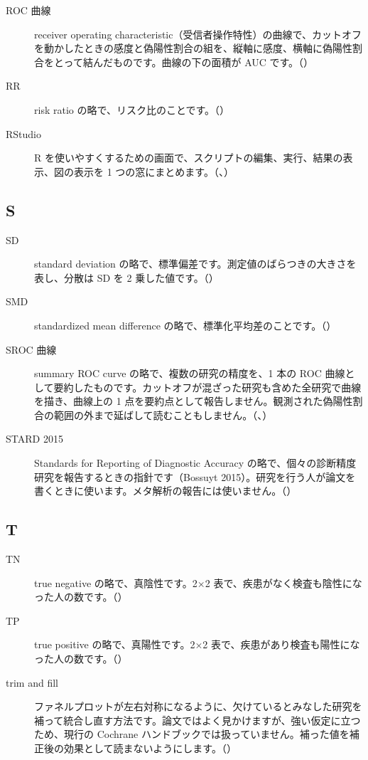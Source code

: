 \begin{description}
\item[ROC 曲線] receiver operating characteristic（受信者操作特性）の曲線で、カットオフを動かしたときの感度と偽陽性割合の組を、縦軸に感度、横軸に偽陽性割合をとって結んだものです。曲線の下の面積が AUC です。（）
\item[RR] risk ratio の略で、リスク比のことです。（）
\item[RStudio] R を使いやすくするための画面で、スクリプトの編集、実行、結果の表示、図の表示を 1 つの窓にまとめます。（、）
\end{description}

\subsection*{S}
\begin{description}
\item[SD] standard deviation の略で、標準偏差です。測定値のばらつきの大きさを表し、分散は SD を 2 乗した値です。（）
\item[SMD] standardized mean difference の略で、標準化平均差のことです。（）
\item[SROC 曲線] summary ROC curve の略で、複数の研究の精度を、1 本の ROC 曲線として要約したものです。カットオフが混ざった研究も含めた全研究で曲線を描き、曲線上の 1 点を要約点として報告しません。観測された偽陽性割合の範囲の外まで延ばして読むこともしません。（、）
\item[STARD 2015] Standards for Reporting of Diagnostic Accuracy の略で、個々の診断精度研究を報告するときの指針です（Bossuyt 2015）。研究を行う人が論文を書くときに使います。メタ解析の報告には使いません。（）
\end{description}

\subsection*{T}
\begin{description}
\item[TN] true negative の略で、真陰性です。2×2 表で、疾患がなく検査も陰性になった人の数です。（）
\item[TP] true positive の略で、真陽性です。2×2 表で、疾患があり検査も陽性になった人の数です。（）
\item[trim and fill] ファネルプロットが左右対称になるように、欠けているとみなした研究を補って統合し直す方法です。論文ではよく見かけますが、強い仮定に立つため、現行の Cochrane ハンドブックでは扱っていません。補った値を補正後の効果として読まないようにします。（）
\end{description}

